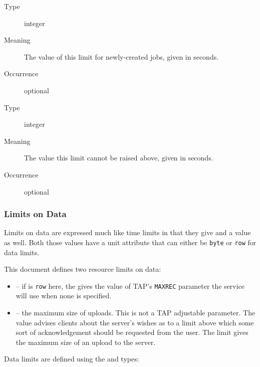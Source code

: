 \documentclass{ivoa}
\begin{document}
\begin{generated}
\begingroup\small\begin{bigdescription}\item[Element \xmlel{default}]
\begin{description}
\item[Type] integer
\item[Meaning] The value of this limit for newly-created jobs, given in seconds.
\item[Occurrence] optional

\end{description}
\item[Element \xmlel{hard}]
\begin{description}
\item[Type] integer
\item[Meaning] The value this limit cannot be raised above, given in seconds.
\item[Occurrence] optional

\end{description}


\end{bigdescription}\endgroup

\endgroup
\end{generated}


\subsubsection{Limits on Data}
Limits on data are expressed much like time limits in that they give
 and a  value as well.
Both those values have a unit attribute that can either be \texttt{byte}
or \texttt{row} for data limits.

This document defines two resource limits on data:


\begin{itemize}

\item {} -- if  is \texttt{row} here,
the  gives the
value of TAP's \texttt{MAXREC} parameter the service will use when none
is specified.{}

\item {} -- the maximum size of uploads.  This
is not a TAP adjustable parameter.  The  value
advises clients about the server's wishes as to a limit above which
some sort of acknowledgement should be requested from the user.  The
 limit gives the maximum size of an upload to the
server.{}

\end{itemize}
Data limits are defined using the 
and  types:
\end{document}
